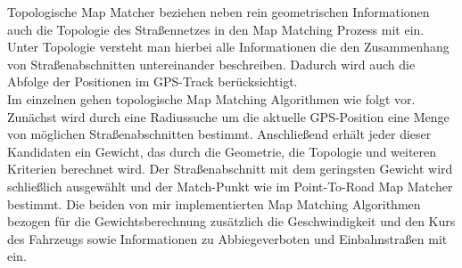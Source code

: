 \documentclass[a4paper]{scrartcl}
\begin{document}
Topologische Map Matcher beziehen neben rein geometrischen Informationen auch die Topologie des Straßennetzes in den Map Matching Prozess mit ein. Unter Topologie versteht man hierbei alle Informationen die den Zusammenhang von Straßenabschnitten untereinander beschreiben. Dadurch wird auch die Abfolge der Positionen im GPS-Track berücksichtigt. \\
Im einzelnen gehen topologische Map Matching Algorithmen wie folgt vor. Zunächst wird durch eine Radiussuche um die aktuelle GPS-Position eine Menge von möglichen Straßenabschnitten bestimmt. Anschließend erhält jeder dieser Kandidaten  ein Gewicht, das durch die Geometrie, die Topologie und weiteren Kriterien berechnet wird. Der Straßenabschnitt mit dem geringsten Gewicht wird schließlich ausgewählt und der Match-Punkt wie im Point-To-Road Map Matcher bestimmt. Die beiden von mir implementierten Map Matching Algorithmen bezogen  für die Gewichtsberechnung zusätzlich die Geschwindigkeit und den Kurs des Fahrzeugs sowie Informationen zu Abbiegeverboten und Einbahnstraßen mit ein. 


\end{document}
